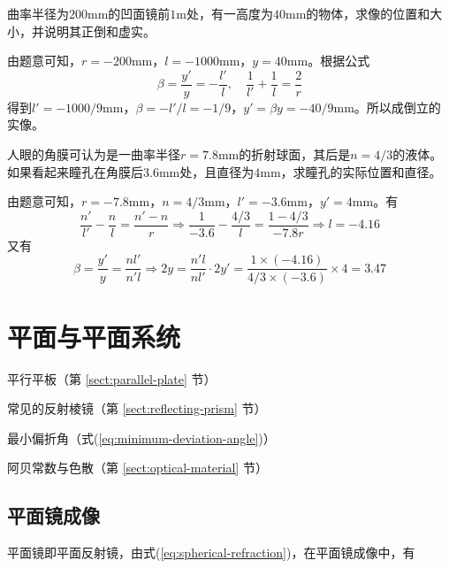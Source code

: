 \documentclass[cn,10pt,chinesefont=founder,math=newtx,cite=super,twoside]{elegantbook}
\begin{document}
\begin{problem}
	曲率半径为$200\mathrm{mm}$的凹面镜前$1\mathrm{m}$处，有一高度为$40\mathrm{mm}$的物体，求像的位置和大小，并说明其正倒和虚实。
\end{problem}
\begin{solution}
	由题意可知，$r=-200\mathrm{mm}$，$l=-1000\mathrm{mm}$，$y=40\mathrm{mm}$。根据公式
	\begin{equation}
	\beta=\frac{y'}{y}=-\frac{l'}{l},\quad \frac{1}{l'}+\frac{1}{l}=\frac{2}{r} \nonumber
	\end{equation}
	得到$l'=-1000/9\mathrm{mm}$，$\beta=-l'/l=-1/9$，$y'=\beta y=-40/9\mathrm{mm}$。所以成倒立的实像。
\end{solution}
\begin{problem}
	人眼的角膜可认为是一曲率半径$r=7.8\mathrm{mm}$的折射球面，其后是$n=4/3$的液体。如果看起来瞳孔在角膜后$3.6\mathrm{mm}$处，且直径为$4\mathrm{mm}$，求瞳孔的实际位置和直径。
\end{problem}
\begin{solution}
	由题意可知，$r=-7.8\mathrm{mm}$，$n=4/3\mathrm{mm}$，$l'=-3.6\mathrm{mm}$，$y'=4\mathrm{mm}$。有
	\begin{equation}
	\frac{n'}{l'}-\frac{n}{l}=\frac{n'-n}{r} \Rightarrow \frac{1}{-3.6}-\frac{4/3}{l}=\frac{1-4/3}{-7.8r} \Rightarrow l=-4.16 \nonumber
	\end{equation}
	又有
	\begin{equation}
	\beta=\frac{y'}{y}=\frac{nl'}{n'l} \Rightarrow 2y=\frac{n'l}{nl'}\cdot 2y'=\frac{1\times (-4.16)}{4/3\times (-3.6)}\times 4=3.47 \nonumber
	\end{equation}
	
\end{solution}

\chapter{平面与平面系统}

\begin{introduction}
	\item 平行平板（第 \ref{sect:parallel-plate} 节）
	\item 常见的反射棱镜（第 \ref{sect:reflecting-prism} 节）
	\item 最小偏折角（式(\ref{eq:minimum-deviation-angle})）
	\item 阿贝常数与色散（第 \ref{sect:optical-material} 节）
\end{introduction}

\section{平面镜成像}
平面镜即平面反射镜，由式(\ref{eq:spherical-refraction})，在平面镜成像中，有
\end{document}

